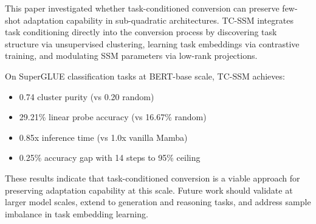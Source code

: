 
This paper investigated whether task-conditioned conversion can preserve few-shot adaptation capability in sub-quadratic architectures. TC-SSM integrates task conditioning directly into the conversion process by discovering task structure via unsupervised clustering, learning task embeddings via contrastive training, and modulating SSM parameters via low-rank projections.

On SuperGLUE classification tasks at BERT-base scale, TC-SSM achieves:
\begin{itemize}
\item 0.74 cluster purity (vs 0.20 random)
\item 29.21\% linear probe accuracy (vs 16.67\% random)
\item 0.85x inference time (vs 1.0x vanilla Mamba)
\item 0.25\% accuracy gap with 14 steps to 95\% ceiling
\end{itemize}

These results indicate that task-conditioned conversion is a viable approach for preserving adaptation capability at this scale. Future work should validate at larger model scales, extend to generation and reasoning tasks, and address sample imbalance in task embedding learning.

